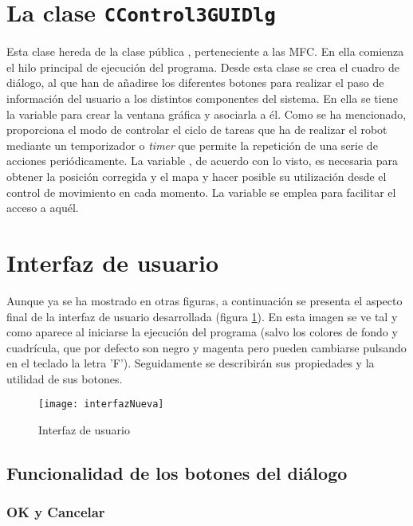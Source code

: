 \section{La clase \texttt{CControl3GUIDlg}}
Esta clase hereda de la clase pública , perteneciente a las MFC. En ella comienza el hilo principal de ejecución del programa. Desde esta clase se crea el cuadro de diálogo, al que han de añadirse los diferentes botones para realizar el paso de información del usuario a los distintos componentes del sistema. En ella se tiene la variable  para crear la ventana gráfica y asociarla a él. Como se ha mencionado, proporciona el modo de controlar el ciclo de tareas que ha de realizar el robot mediante un temporizador o \emph{timer} que permite la repetición de una serie de acciones periódicamente. La variable , de acuerdo con lo visto, es necesaria para obtener la posición corregida y el mapa y hacer posible su utilización desde el control de movimiento en cada momento. La variable  se emplea para facilitar el acceso a aquél. %

\section{Interfaz de usuario}
Aunque ya se ha mostrado en otras figuras, a continuación se presenta el aspecto final de la interfaz de usuario desarrollada (figura \ref{fg:interfaz}). En esta imagen se ve tal y como aparece al iniciarse la ejecución del programa (salvo los colores de fondo y cuadrícula, que por defecto son negro y magenta pero pueden cambiarse pulsando en el teclado la letra 'F'). Seguidamente se describirán sus propiedades y la utilidad de sus botones.

\begin{figure}[h]
  \centering\texttt{[image: interfazNueva]}\\
  \caption{Interfaz de usuario}\label{fg:interfaz}
\end{figure}


\subsection{Funcionalidad de los botones del diálogo}

\subsubsection{OK y Cancelar}

